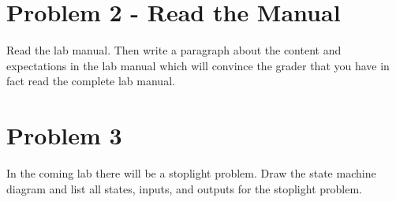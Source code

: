 \section{Problem 2 - Read the Manual}

Read the lab manual. Then write a paragraph about the content and expectations in the lab manual which will convince the grader that you have in fact read the complete lab manual.


\section{Problem 3}

In the coming lab there will be a stoplight problem. Draw the state machine diagram and list all states, inputs, and outputs for the stoplight problem.
